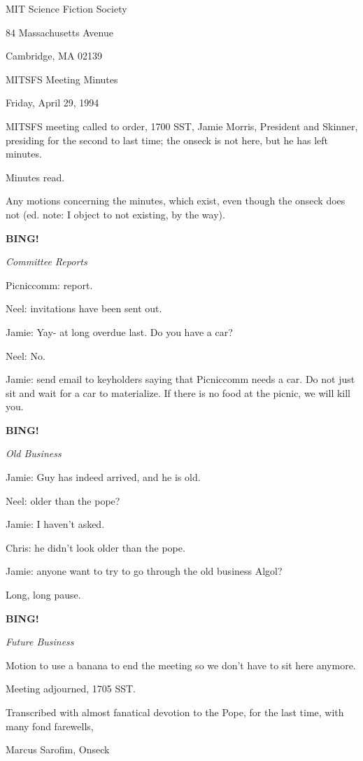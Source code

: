 \documentclass[12pt]{article}
\newcommand{\bing}{{\bf BING!} }
\newcommand{\goto}[1]{\bing \vskip 12pt \centerline{{\em{#1}}}}
\begin{document}
\begin{center}

MIT Science Fiction Society 

84 Massachusetts Avenue

Cambridge, MA 02139

\vspace{12pt}

MITSFS Meeting Minutes 

Friday, April 29, 1994

\end{center}
 
\vspace{18pt}

\setlength{\parskip}{6pt}

\noindent
MITSFS meeting called to order, 1700 SST,
Jamie Morris, President and Skinner, presiding for the second to last time; the onseck is not here, but he has left minutes.

Minutes read.

Any motions concerning the minutes, which exist, even though the onseck does not (ed. note: I object to not existing, by the way).

\goto{Committee Reports}

Picniccomm: report.

Neel: invitations have been sent out.

Jamie: Yay- at long overdue last. Do you have a car? 

Neel: No.

Jamie: send email to keyholders saying that Picniccomm needs a car. Do not just sit and wait for a car to materialize. If there is no food at the picnic, we will kill you.

\goto{Old Business}

Jamie: Guy has indeed arrived, and he is old.

Neel: older than the pope?

Jamie: I haven't asked.

Chris: he didn't look older than the pope.

Jamie: anyone want to try to go through the old business Algol?

Long, long pause.

\goto{Future Business}

Motion to use a banana to end the meeting so we don't have to sit here anymore.

\vspace{12pt}

\noindent
Meeting adjourned, 1705 SST.

\vspace{18pt}

\centerline{Transcribed with almost fanatical devotion to the Pope, for the last time, with many fond farewells,}
\centerline{Marcus Sarofim, Onseck}
\end{document}
